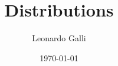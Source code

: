\documentclass[9pt]{article}
\begin{document}
\author{Leonardo Galli}
\title{Distributions}

\date{\today}

\setcounter{tocdepth}{2}

\setcounter{page}{1} 



%



\end{document}
